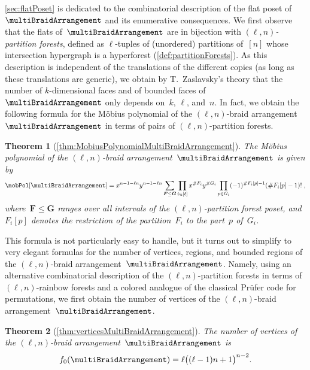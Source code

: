\documentclass{amsart}
\newtheorem*{theorem*}{Theorem}
\theoremstyle{definition}
\renewcommand{\b}[1]{{\boldsymbol{#1}}} %
\newcommand{\card}[1]{\##1} %
\renewcommand{\b}[1]{\boldsymbol{#1}} %
\begin{document}
\cref{sec:flatPoset} is dedicated to the combinatorial description of the flat poset of~$\multiBraidArrangement$ and its enumerative consequences.
We first observe that the flats of~$\multiBraidArrangement$ are in bijection with \emph{$(\ell,n)$-partition forests}, defined as $\ell$-tuples of (unordered) partitions of~$[n]$ whose intersection hypergraph is a hyperforest (\cref{def:partitionForests}).
As this description is independent of the translations of the different copies (as long as these translations are generic), we obtain by T.~Zaslavsky's theory that the number of \mbox{$k$-dimensional} faces and of bounded faces of~$\multiBraidArrangement$ only depends on~$k$, $\ell$, and~$n$. %
In fact, we obtain the following formula for the M\"obius polynomial of the $(\ell,n)$-braid arrangement~$\multiBraidArrangement$ in terms of pairs of $(\ell,n)$-partition forests.

\begin{theorem*}[\cref{thm:MobiusPolynomialMultiBraidArrangement}]
The M\"obius polynomial of the $(\ell,n)$-braid arrangement~$\multiBraidArrangement$ is given by
\[
\mobPol[\multiBraidArrangement] = x^{n-1-\ell n} y^{n-1-\ell n} \sum_{\b{F} \le \b{G}} \prod_{i \in [\ell]} x^{\card{F_i}} y^{\card{G_i}} \prod_{p \in G_i} (-1)^{\card{F_i[p]}-1} (\card{F_i[p]}-1)! \; ,
\]
where~$\b{F} \le \b{G}$ ranges over all intervals of the $(\ell,n)$-partition forest poset, and~$F_i[p]$ denotes the restriction of the partition~$F_i$ to the part~$p$ of~$G_i$.
\end{theorem*}

This formula is not particularly easy to handle, but it turns out to simplify to very elegant formulas for the number of vertices, regions, and bounded regions of the $(\ell,n)$-braid arrangement~$\multiBraidArrangement$.
Namely, using an alternative combinatorial description of the $(\ell,n)$-partition forests in terms of $(\ell, n)$-rainbow forests and a colored analogue of the classical Pr\"ufer code for permutations, we first obtain the number of vertices of the $(\ell,n)$-braid arrangement~$\multiBraidArrangement$.

\begin{theorem*}[\cref{thm:verticesMultiBraidArrangement}]
The number of vertices of the $(\ell,n)$-braid arrangement~$\multiBraidArrangement$ is
\[
f_0(\multiBraidArrangement) = \ell \big( (\ell-1) n + 1 \big)^{n-2}.
\]
\end{theorem*}
\end{document}
